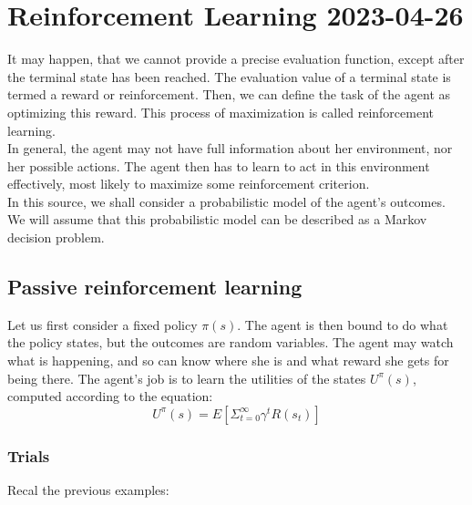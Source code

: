 
\chapter{Reinforcement Learning 2023-04-26}

It may happen, that we cannot provide a precise evaluation function, except after the terminal state has been
reached. The evaluation value of a terminal state is termed a reward or reinforcement. Then, we can define
the task of the agent as optimizing this reward. This process of maximization is called reinforcement learning.
\\
In general, the agent may not have full information about her environment, nor her possible actions.
The agent then has to learn to act in this environment effectively, most likely to maximize some reinforcement
criterion.\\
In this source, we shall consider a probabilistic model of the agent's outcomes. We will assume that
this probabilistic model can be described as a Markov decision problem.

\section{Passive reinforcement learning}
Let us first consider a fixed policy $\pi(s)$. The agent is then bound to do what the policy states, but
the outcomes are random variables. The agent may watch what is happening, and so can know where she is
and what reward she gets for being there.
The agent's job is to learn the utilities of the states $U^{\pi} (s)$, computed according to the equation:
\begin{equation}
    U^{\pi}(s) = E[\Sigma_{t=0}^{\infty}\gamma^tR(s_t)]
\end{equation}

\subsection{Trials}
Recal the previous examples:

